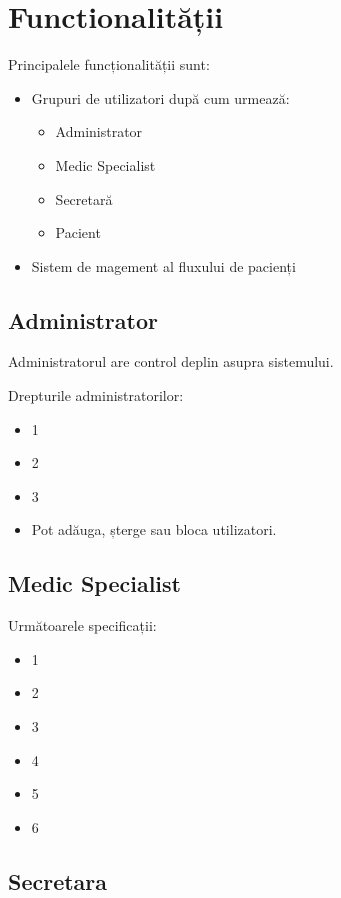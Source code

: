 \documentclass[a4paper,12pt]{article}
\begin{document}
\section{Functionalității}

Principalele funcționalității sunt:
\begin{itemize}
\item Grupuri de utilizatori după cum urmează:
\begin{itemize}
\item Administrator
\item Medic Specialist
\item Secretară
\item Pacient
\end{itemize}
\item Sistem de magement al fluxului de pacienți
\end{itemize}

\subsection{Administrator}

Administratorul are control deplin asupra sistemului.

Drepturile administratorilor:

\begin{itemize}
\item 1
\item 2
\item 3
\item Pot adăuga, șterge sau bloca utilizatori.
\end{itemize}

\subsection{Medic Specialist}

Următoarele specificații:

\begin{itemize}
\item 1
\item 2
\item 3
\item 4
\item 5
\item 6
\end{itemize}

\subsection{Secretara}
\end{document}
